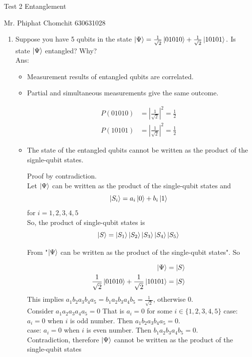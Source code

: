 \documentclass[12pt, a4paper]{article}
\begin{document}
	\begin{center}
		Test 2  Entanglement
	\end{center}
	
	Mr. Phiphat Chomchit 630631028
	\begin{enumerate}
		\item Suppose you have 5 qubits in the state  $\ket{\Psi} = \frac{1}{\sqrt{2}}\ket{01010} + \frac{1}{\sqrt{2}}\ket{10101} .$ Is state $\ket{\Psi}$ entangled? Why?\\
		
		Ans:
		\begin{itemize}
			\item Measurement results of entangled qubits are correlated.
			\item Partial and simultaneous measurements give the same outcome.
			
			\begin{align}
				P(01010) &= \left|\frac{1}{\sqrt{2}}\right|^2 = \frac{1}{2}\\
				P(10101) &= \left|\frac{1}{\sqrt{2}}\right|^2 = \frac{1}{2}
			\end{align}
			\item The state of the entangled qubits cannot be written as the product of the signle-qubit states.
			
			Proof by contradiction.\\
			Let $\ket{\Psi}$ can be written as the product of the single-qubit states and
			$$\ket{S_i} = a_i\ket{0} + b_i\ket{1}$$
			for $i = 1, 2, 3, 4, 5$\\
			So, the product of single-qubit states is
			$$\ket{S} = \ket{S_1}\ket{S_2}\ket{S_3}\ket{S_4}\ket{S_5}$$
			
			From "$\ket{\Psi}$ can be written as the product of the single-qubit states". So
			
			\begin{align}
				\ket{\Psi} &= \ket{S}\\
				 \frac{1}{\sqrt{2}}\ket{01010} + \frac{1}{\sqrt{2}}\ket{10101} &= \ket{S}
			\end{align}
			This implies $a_1b_2a_3b_4a_5 = b_1a_2b_3a_4b_5 = \frac{1}{\sqrt{2}}$, otherwise $0$.\\
			Consider $a_1a_2a_3a_4a_5 = 0$ That is $a_i = 0$ for some $i \in \{1,2,3,4,5\}$
			case: $a_i = 0$ when $i$ is odd number. Then $a_1b_2a_3b_4a_5 = 0$.\\
			case: $a_i = 0$ when $i$ is even number. Then $b_1a_2b_3a_4b_5 = 0$.\\
			Contradiction, therefore $\ket{\Psi}$ cannot be written as the product of the single-qubit states
		\end{itemize}


\end{enumerate}
\end{document}

